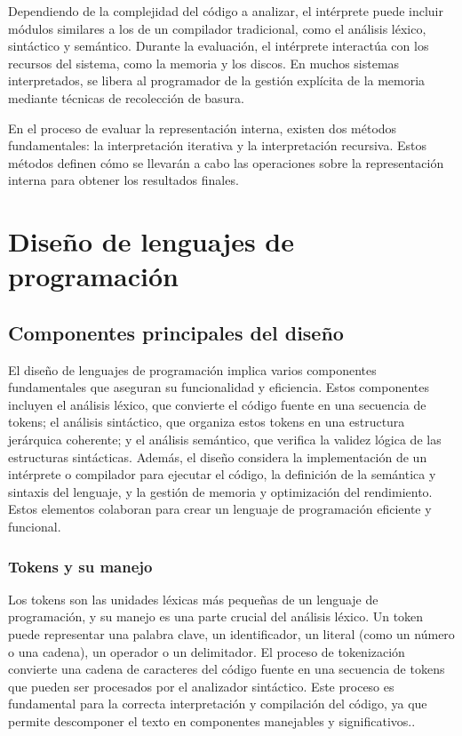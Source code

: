 Dependiendo de la complejidad del código a analizar, el intérprete puede incluir módulos similares a los de un compilador tradicional, como el análisis léxico, sintáctico y semántico. Durante la evaluación, el intérprete interactúa con los recursos del sistema, como la memoria y los discos. En muchos sistemas interpretados, se libera al programador de la gestión explícita de la memoria mediante técnicas de recolección de basura. \parencite{LabraGayo2003}

En el proceso de evaluar la representación interna, existen dos métodos fundamentales: la interpretación iterativa y la interpretación recursiva. Estos métodos definen cómo se llevarán a cabo las operaciones sobre la representación interna para obtener los resultados finales. \parencite{LabraGayo2003}

\section{Diseño de lenguajes de programación}
\subsection{Componentes principales del diseño}
El diseño de lenguajes de programación implica varios componentes fundamentales que aseguran su funcionalidad y eficiencia. Estos componentes incluyen el análisis léxico, que convierte el código fuente en una secuencia de tokens; el análisis sintáctico, que organiza estos tokens en una estructura jerárquica coherente; y el análisis semántico, que verifica la validez lógica de las estructuras sintácticas. Además, el diseño considera la implementación de un intérprete o compilador para ejecutar el código, la definición de la semántica y sintaxis del lenguaje, y la gestión de memoria y optimización del rendimiento. Estos elementos colaboran para crear un lenguaje de programación eficiente y funcional.

\subsubsection{Tokens y su manejo}
Los tokens son las unidades léxicas más pequeñas de un lenguaje de programación, y su manejo es una parte crucial del análisis léxico. Un token puede representar una palabra clave, un identificador, un literal (como un número o una cadena), un operador o un delimitador. El proceso de tokenización convierte una cadena de caracteres del código fuente en una secuencia de tokens que pueden ser procesados por el analizador sintáctico. Este proceso es fundamental para la correcta interpretación y compilación del código, ya que permite descomponer el texto en componentes manejables y significativos.. \parencite{Jeffery2021}

